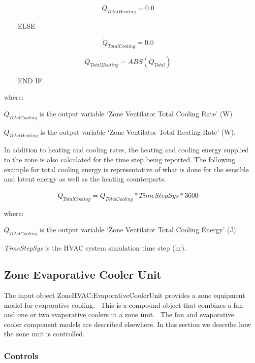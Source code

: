 \begin{equation}
{\dot Q_{TotalHeating}} = 0.0
\end{equation}

~~~~ELSE

\begin{equation}
{\dot Q_{TotalCooling}} = 0.0
\end{equation}

\begin{equation}
{\dot Q_{TotalHeating}} = ABS ({\dot Q_{Total}})
\end{equation}

~~~~END IF

where:

\(\dot{Q}_{TotalCooling}\) is the output variable `Zone Ventilator Total Cooling Rate' (W)

\(\dot{Q}_{TotalHeating}\) is the output variable `Zone Ventilator Total Heating Rate' (W).

In addition to heating and cooling rates, the heating and cooling energy supplied to the zone is also calculated for the time step being reported. The following example for total cooling energy is representative of what is done for the sensible and latent energy as well as the heating counterparts.

\begin{equation}
{Q_{TotalCooling}} = {\dot Q_{TotalCooling}}*TimeStepSys*3600
\end{equation}

where:

\(\dot{Q}_{TotalCooling}\) is the output variable `Zone Ventilator Total Cooling Energy' (J)

\emph{TimeStepSys} is the HVAC system simulation time step (hr).

\subsection{Zone Evaporative Cooler Unit}\label{zone-evaporative-cooler-unit}

The input object ZoneHVAC:EvaporativeCoolerUnit provides a zone equipment model for evaporative cooling.~ This is a compound object that combines a fan and one or two evaporative coolers in a zone unit.~ The fan and evaporative cooler component models are described elsewhere. In this section we describe how the zone unit is controlled.

\subsubsection{Controls}\label{controls-000}


